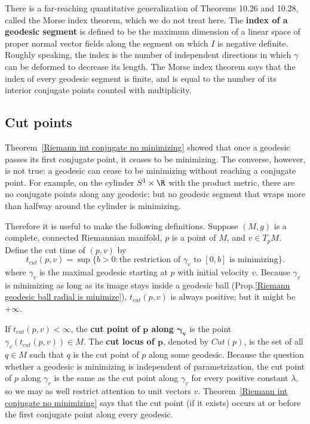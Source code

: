 There is a far-reaching quantitative generalization of Theorems 10.26 and 10.28, called the Morse index theorem, which we do not treat here. The \textbf{index of a geodesic
segment} is defined to be the maximum dimension of a linear space of proper normal vector fields along the segment on which $I$ is negative definite. Roughly speaking, 
the index is the number of independent directions in which $\gamma$ can be deformed to decrease its length. The Morse index theorem says that the index of every geodesic 
segment is finite, and is equal to the number of its interior conjugate points counted with multiplicity.
\subsection{Cut points}
Theorem~\ref{Riemann int conjugate no minimizing} showed that once a geodesic passes its first conjugate point, it ceases to be minimizing. The converse, however, is 
not true: a geodesic can cease to be minimizing without reaching a conjugate point. For example, on the cylinder $S^1\times\R$ with the product metric, there are no 
conjugate points along any geodesic; but no geodesic segment that wraps more than halfway around the cylinder is minimizing.\par
Therefore it is useful to make the following definitions. Suppose $(M,g)$ is a complete, connected Riemannian manifold, $p$ is a point of $M$, and $v\in T_pM$. Define 
the cut time of $(p,v)$ by
\[t_{cut}(p,v)=\sup\{b>0:\text{the restriction of $\gamma_v$ to $[0,b]$ is minimizing}\}.\]
where $\gamma_v$ is the maximal geodesic starting at $p$ with initial velocity $v$. Because $\gamma_v$ is minimizing as long as its image stays inside a geodesic ball 
(Prop.\ref{Riemann geodesic ball radial is minimize}), $t_{cut}(p,v)$ is always positive; but it might be $+\infty$.\par
If $t_{cut}(p,v)<\infty$, the \textbf{cut point of $\bm{p}$ along $\bm{\gamma_v}$} is the point $\gamma_v(t_{cut}(p,v))\in M$. The \textbf{cut locus of $\bm{p}$}, 
denoted by $Cut(p)$, is the set of all $q\in M$ such that $q$ is the cut point of $p$ along some geodesic. Because the question whether a geodesic is minimizing is 
independent of parametrization, the cut point of $p$ along $\gamma_v$ is the same as the cut point along $\gamma_v$ for every positive constant $\lambda$, so we may 
as well restrict attention to unit vectors $v$. Theorem~\ref{Riemann int conjugate no minimizing} says that the cut point (if it exists) occurs at or before the first 
conjugate point along every geodesic.\par
